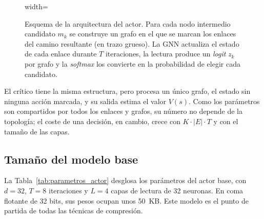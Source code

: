 \begin{figure}[H]
\begin{adjustbox}{width=\textwidth}
	\end{adjustbox}
	\caption[Esquema de la arquitectura del actor]{Esquema de la arquitectura del actor. Para cada nodo intermedio candidato $m_k$ se construye un grafo en el que se marcan los enlaces del camino resultante (en trazo grueso). La GNN actualiza el estado de cada enlace durante $T$ iteraciones, la lectura produce un \textit{logit} $z_k$ por grafo y la \textit{softmax} los convierte en la probabilidad de elegir cada candidato.}
	\label{fig:actor}
\end{figure}

El crítico tiene la misma estructura, pero procesa un único grafo, el estado sin ninguna acción marcada, y su salida estima el valor $V(s)$. Como los parámetros son compartidos por todos los enlaces y grafos, su número no depende de la topología; el coste de una decisión, en cambio, crece con $K \cdot |E| \cdot T$ y con el tamaño de las capas.

\subsection{Tamaño del modelo base}

La Tabla~\ref{tab:parametros_actor} desglosa los parámetros del actor base, con $d = 32$, $T = 8$ iteraciones y $L = 4$ capas de lectura de 32 neuronas. En coma flotante de 32 bits, sus pesos ocupan unos 50~KB. Este modelo es el punto de partida de todas las técnicas de compresión.

